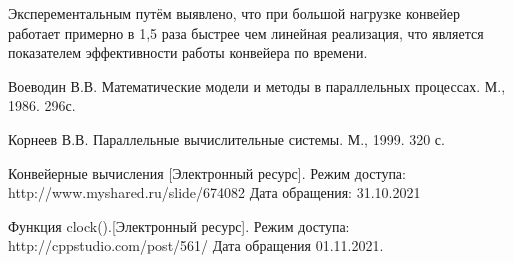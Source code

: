 \documentclass[12pt]{report}
\begin{document}
Эксперементальным путём выявлено, что при большой нагрузке конвейер работает примерно в 1,5 раза быстрее чем линейная реализация, что является показателем эффективности работы конвейера по времени.




\begin{thebibliography}{9}
		
		 Воеводин В.В. Математические модели и методы в параллельных процессах. М., 1986. 296с.
		
		 Корнеев В.В. Параллельные вычислительные системы. М., 1999. 320 с.
		
		  Конвейерные вычисления [Электронный ресурс]. Режим доступа: http://www.myshared.ru/slide/674082 Дата обращения: 31.10.2021
		
		 Функция clock().[Электронный ресурс]. Режим доступа: http://cppstudio.com/post/561/ Дата обращения 01.11.2021.
\end{thebibliography}
\end{document}
